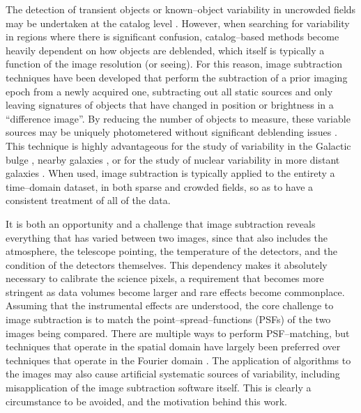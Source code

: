 \documentclass[iop]{emulateapj}
\begin{document}
The detection of transient objects or known--object variability in uncrowded fields may be undertaken at the catalog level \cite[e.g.][]{2009ApJ...696..870D}.
However, when searching for variability in regions where there is significant confusion, catalog--based methods become heavily dependent on how objects are deblended, which itself is typically a function of the image resolution (or seeing).
For this reason, image subtraction techniques have been developed that perform the subtraction of a prior imaging epoch from a newly acquired one, subtracting out all static sources and only leaving signatures of objects that have changed in position or brightness in a ``difference image''.
By reducing the number of objects to measure, these variable sources may be uniquely photometered without significant deblending issues \citep[however, crowded difference images with spatially overlapping variable sources are possible, e.g.][]{1996ApJ...473L..87C}.
This technique is highly advantageous for the study of variability in the Galactic bulge \citep[e.g. microlensing;][]{1999ApJ...521..602A}, nearby galaxies \citep[e.g. nearby supernovae;][]{2011Natur.480..344N}, or for the study of nuclear variability in more distant galaxies \cite[e.g.][]{2014ApJ...782...37C}.
When used, image subtraction is typically applied to the entirety a time--domain dataset, in both sparse and crowded fields, so as to have a consistent treatment of all of the data.

It is both an opportunity and a challenge that image subtraction reveals everything that has varied between two images, since that also includes the atmosphere, the telescope pointing, the temperature of the detectors, and the condition of the detectors themselves.
This dependency makes it absolutely necessary to calibrate the science pixels, a requirement that becomes more stringent as data volumes become larger and rare effects become commonplace.
Assuming that the instrumental effects are understood, the core challenge to image subtraction is to match the point--spread--functions (PSFs) of the two images being compared.
There are multiple ways to perform PSF--matching, but techniques that operate in the spatial domain \citep{1998ApJ...503..325A,2000A&AS..144..363A} have largely been preferred over techniques that operate in the Fourier domain \citep{1996AJ....112.2872T}.
The application of algorithms to the images may also cause artificial systematic sources of variability, including misapplication of the image subtraction software itself.
This is clearly a circumstance to be avoided, and the motivation behind this work.
\end{document}
